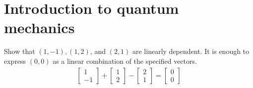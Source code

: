 
\chapter{Introduction to quantum mechanics}
 Show that $(1, -1), (1,2)$, and $(2,1)$ are linearly dependent.
\Soln It is enough to express $(0, 0)$ as a linear combination of the specified vectors.
\begin{align*}
	\begin{bmatrix}
		1 \\
		-1
	\end{bmatrix}
	+
	\begin{bmatrix}
		1 \\
		2
	\end{bmatrix}
	-
	\begin{bmatrix}
		2 \\
		1
	\end{bmatrix}
	=
	\begin{bmatrix}
		0 \\
		0
	\end{bmatrix}
\end{align*}

